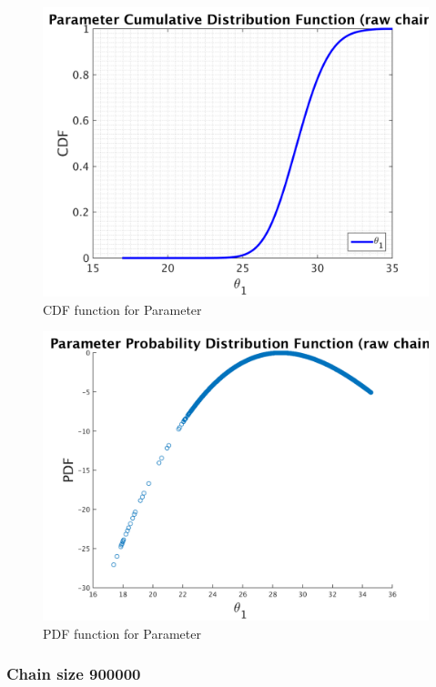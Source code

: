 \begin{figure}[H]
  
  \centering
   \includegraphics[scale=0.75]{53_results/output_700000/simple_ip_cdf_raw}
   \caption{CDF function for Parameter }
\end{figure}



\begin{figure}[H]
  
  \centering
   \includegraphics[scale=0.75]{53_results/output_700000/ip_logLike_unified}
   \caption{PDF function for Parameter }
\end{figure}



\subsubsection{Chain size 900000 }

